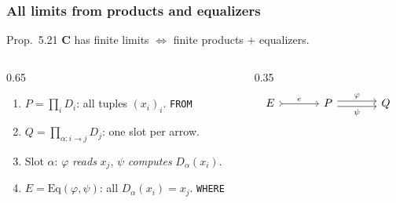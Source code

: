 \documentclass[11pt,t,usepdftitle=false,aspectratio=169]{beamer}
\newcommand{\C}{\ensuremath{\mathbf{C}}}
\newcommand{\Sets}{\ensuremath{\mathbf{Sets}}}
\newcommand{\Hom}{\operatorname{Hom}}
\newcommand{\Cone}{\operatorname{Cone}}
\begin{document}
\begin{frame}[fragile]
\frametitle{All limits from products and equalizers}

  \begin{block}{Prop.\ 5.21}
    $\C$ has finite limits $\iff$ finite products $+$ equalizers.
  \end{block}

  \begin{columns}[T]
    \begin{column}{0.65\textwidth}
      \begin{enumerate}
        \item $P = \prod_i D_i$: all tuples $(x_i)_i$. \hfill \texttt{FROM}
        \item $Q = \prod_{\alpha: i \to j} D_j$: one slot per arrow.
        \item Slot $\alpha$: $\varphi$ \emph{reads} $x_j$,
          $\psi$ \emph{computes} $D_\alpha(x_i)$.
        \item $E = \mathrm{Eq}(\varphi, \psi)$: all $D_\alpha(x_i) = x_j$.
          \hfill \texttt{WHERE}
      \end{enumerate}
    \end{column}
    \begin{column}{0.35\textwidth}
      \[
      \begin{tikzcd}[sep=large]
        E \ar[r, tail, "e"] & P \ar[r, shift left, "\varphi"]
          \ar[r, shift right, "\psi"'] & Q
      \end{tikzcd}
      \]
    \end{column}
  \end{columns}

\end{frame}

\end{document}
